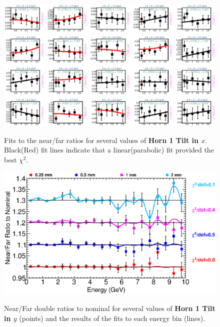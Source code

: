 \begin{figure}[ht]
  \begin{center}
    {\includegraphics[width=5.0in]{figures/Horn1XTilt_nof_fits.eps}}
  \end{center}
\caption{ Fits to the near/far ratios for several values of {\bf Horn 1 Tilt in $x$}. Black(Red) fit lines indicate that a linear(parabolic) fit provided the best $\chi^2$. }
\end{figure}

\begin{figure}[ht]
  \begin{center}
    {\includegraphics[width=6.0in]{figures/Horn1YTilt_nof_summary.eps}}
  \end{center}
\caption{ Near/Far double ratios to nominal for several values of {\bf Horn 1 Tilt in $y$} (points) and the results of the fits to each energy bin (lines).}
\end{figure}

\clearpage

